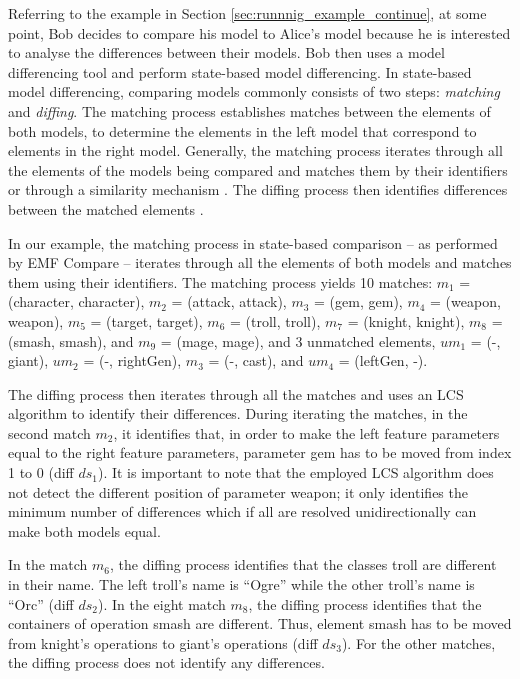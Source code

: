 Referring to the example in Section \ref{sec:runnnig_example_continue}, at some point, Bob decides to compare his model to Alice's model because he is interested to analyse the differences between their models. Bob then uses a model differencing tool and perform state-based model differencing. 
In state-based model differencing, comparing models commonly consists of two steps: \emph{matching} and \emph{diffing}.
The matching process establishes matches between the elements of both models, to determine the elements in the left model that correspond to elements in the right model. Generally, the matching process iterates through all the elements of the models being compared and matches them by their identifiers or through a similarity mechanism  \cite{DBLP:conf/sfm/BroschKLSWW12,emfcompare2018developer}. The diffing process then identifies differences between the matched elements \cite{DBLP:conf/sfm/BroschKLSWW12,emfcompare2018developer}. 

In our example, the matching process in state-based comparison -- as performed by EMF Compare \cite{emfcompare2018developer} -- iterates through all the elements of both models and matches them using their identifiers. The matching process yields 10 matches: $m_1$ = (\textsf{character}, \textsf{character}), $m_2$ = (\textsf{attack}, \textsf{attack}), $m_3$ = (\textsf{gem}, \textsf{gem}), $m_4$ = (\textsf{weapon}, \textsf{weapon}), $m_5$ = (\textsf{target}, \textsf{target}), $m_6$ = (\textsf{troll}, \textsf{troll}), $m_7$ = (\textsf{knight}, \textsf{knight}), $m_8$ = (\textsf{smash}, \textsf{smash}), and $m_9$ = (\textsf{mage}, \textsf{mage}), and 3 unmatched elements, $um_1$ = (-, \textsf{giant}), $um_2$ = (-, \textsf{rightGen}), $m_3$ = (-, \textsf{cast}), and $um_4$ = (\textsf{leftGen}, -). 

The diffing process then iterates through all the matches and uses an LCS algorithm to identify their differences. During iterating the matches, in the second match $m_2$, it identifies that, in order to make the left feature \textsf{parameters} equal to the right feature \textsf{parameters}, parameter \textsf{gem} has to be moved from index 1 to 0 (diff $ds_1$). It is important to note that the employed LCS algorithm does not detect the different position of parameter \textsf{weapon}; it only identifies the minimum number of differences which if all are resolved unidirectionally can make both models equal.

In the match $m_6$, the diffing process identifies that the classes \textsf{troll} are different in their \textsf{name}. The left \textsf{troll}'s \textsf{name} is ``Ogre'' while the other \textsf{troll}'s \textsf{name} is ``Orc'' (diff $ds_2$). In the eight match $m_8$, the diffing process identifies that the containers of operation \textsf{smash} are different. Thus, element \textsf{smash} has to be moved from \textsf{knight}'s \textsf{operations} to \textsf{giant}'s \textsf{operations} (diff $ds_3$). For the other matches, the diffing process does not identify any differences. 

